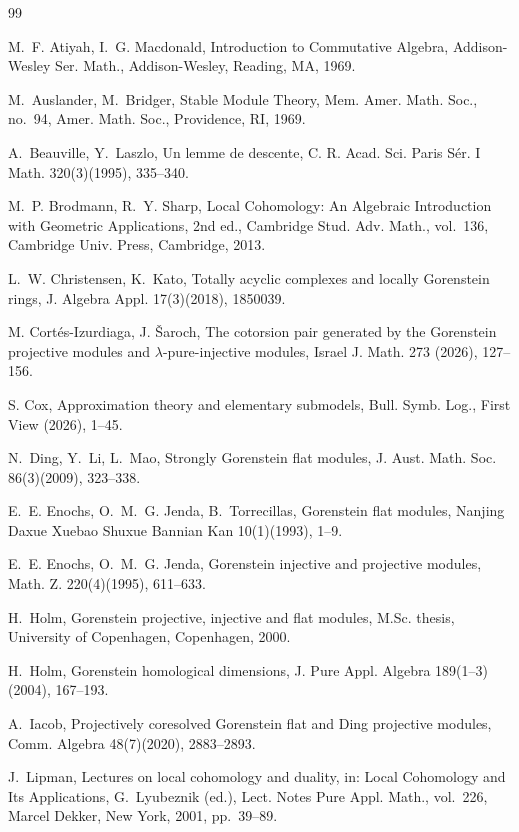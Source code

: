 \documentclass[11pt]{amsart}
\theoremstyle{remark}
\begin{document}
\begin{thebibliography}{99}

M.~F. Atiyah, I.~G. Macdonald,
Introduction to Commutative Algebra,
Addison-Wesley Ser. Math., Addison-Wesley, Reading, MA, 1969.

M.~Auslander, M.~Bridger,
Stable Module Theory,
Mem. Amer. Math. Soc., no.~94, Amer. Math. Soc., Providence, RI, 1969.

A.~Beauville, Y.~Laszlo,
Un lemme de descente,
C. R. Acad. Sci. Paris S\'er. I Math. 320(3)(1995), 335--340.

M.~P. Brodmann, R.~Y. Sharp,
Local Cohomology: An Algebraic Introduction with Geometric Applications,
2nd ed., Cambridge Stud. Adv. Math., vol.~136,
Cambridge Univ. Press, Cambridge, 2013.

L.~W. Christensen, K.~Kato,
Totally acyclic complexes and locally Gorenstein rings,
J. Algebra Appl. 17(3)(2018), 1850039.

M. Cort\'es-Izurdiaga, J. \v{S}aroch,
The cotorsion pair generated by the Gorenstein projective modules
and $\lambda$-pure-injective modules,
Israel J. Math. 273 (2026), 127--156.

S. Cox,
Approximation theory and elementary submodels,
Bull. Symb. Log., First View (2026), 1--45.

N.~Ding, Y.~Li, L.~Mao,
Strongly Gorenstein flat modules,
J. Aust. Math. Soc. 86(3)(2009), 323--338.

E.~E. Enochs, O.~M.~G. Jenda, B.~Torrecillas,
Gorenstein flat modules,
Nanjing Daxue Xuebao Shuxue Bannian Kan 10(1)(1993), 1--9.

E.~E. Enochs, O.~M.~G. Jenda,
Gorenstein injective and projective modules,
Math. Z. 220(4)(1995), 611--633.

H.~Holm,
Gorenstein projective, injective and flat modules,
M.Sc. thesis, University of Copenhagen, Copenhagen, 2000.

H.~Holm,
Gorenstein homological dimensions,
J. Pure Appl. Algebra 189(1--3)(2004), 167--193.

A.~Iacob,
Projectively coresolved Gorenstein flat and Ding projective modules,
Comm. Algebra 48(7)(2020), 2883--2893.

J.~Lipman,
Lectures on local cohomology and duality,
in: Local Cohomology and Its Applications, G.~Lyubeznik (ed.),
Lect. Notes Pure Appl. Math., vol.~226,
Marcel Dekker, New York, 2001, pp.~39--89.


\end{thebibliography}
\end{document}
